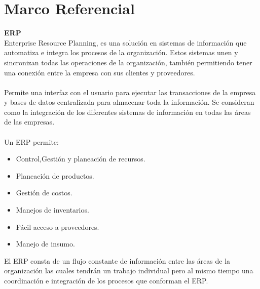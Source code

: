 \section{Marco Referencial}
%
\textbf{ERP}%
\\%
Enterprise Resource Planning, es una soluci\'on en sistemas de informaci\'on que automatiza e integra  los procesos de la organizaci\'on. Estos sistemas unen y sincronizan todas las operaciones de la organizaci\'on, tambi\'en permitiendo tener una conexi\'on entre la empresa con sus clientes y proveedores.%
\\%
\\%
Permite una interfaz con el usuario para ejecutar las transacciones de la empresa y bases de datos centralizada para almacenar toda la informaci\'on. Se consideran como la integraci\'on de los diferentes sistemas de informaci\'on en todas las \'areas de las empresas.%
\\%
\\%
Un ERP permite:%
\\%
\begin{itemize}
	\item Control,Gesti\'on y planeaci\'on de recursos.
	\item Planeaci\'on de productos.
	\item Gesti\'on de costos.
	\item Manejos de inventarios.
	\item F\'acil acceso a proveedores.
	\item Manejo de insumo.
\end{itemize}
%
El ERP consta de un flujo constante de informaci\'on entre las \'areas de la organizaci\'on las cuales tendr\'an un trabajo individual pero al mismo tiempo una coordinaci\'on e integraci\'on de los procesos que conforman el ERP.%
\\%
